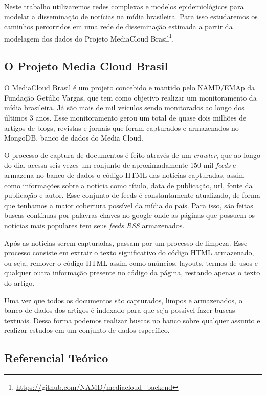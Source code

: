 \documentclass[a4paper,12pt]{article}
\begin{document}
Neste trabalho utilizaremos redes complexas e modelos epidemiológicos para modelar a disseminação de notícias na mídia brasileira. 
Para isso
estudaremos os caminhos percorridos em uma rede de disseminação estimada a partir da modelagem dos
dados do Projeto MediaCloud Brasil\footnote[1]{\url{https://github.com/NAMD/mediacloud_backend}}.


\subsection{O Projeto Media Cloud Brasil}

 O MediaCloud Brasil é um projeto concebido e mantido pelo NAMD/EMAp da Fundação Getúlio Vargas, que tem como objetivo realizar um monitoramento
 da mídia brasileira. Já são mais de mil veículos sendo monitorados ao longo dos últimos 3 anos. Esse monitoramento gerou um total de quase dois milhões
 de artigos de blogs, revistas e jornais que foram capturados e armazenados no MongoDB, banco de dados do Media Cloud.
  
 O processo de captura de documentos é feito através de um \textit{crawler}, que ao longo do dia,  acessa seis vezes um conjunto de 
 aproximadamente 150 mil \textit{feeds} e armazena no banco de dados o código HTML das notícias capturadas, assim como informações sobre
 a notícia como título, data 
 de publicação, url, fonte da publicação e autor. Esse conjunto de feeds é 
 constantamente atualizado, de forma que tenhamos a maior cobertura possível da mídia do país. Para isso, são feitas buscas contínuas
 por palavras chaves no google onde as páginas que possuem os notícias mais populares
 tem seus \textit{feeds RSS} armazenados.
 
 Após as notícias serem capturadas, passam por um processo de limpeza. Esse processo consiste em 
 extrair o texto significativo do código HTML armazenado, ou seja, remover o código HTML assim como anúncios, layouts, termos de usos
 e qualquer outra informação presente no código da página, restando apenas o texto do artigo.
 
 Uma vez que todos os documentos são capturados, limpos e armazenados, o banco de dados dos artigos é indexado para que seja possível
 fazer buscas textuais. Dessa forma podemos realizar buscas no banco sobre qualquer assunto e realizar estudos em um conjunto de dados
 específico.

\subsection{Referencial Teórico} 
\end{document}
